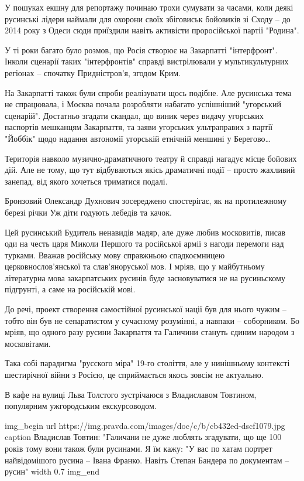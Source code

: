 У пошуках екшну для репортажу починаю трохи сумувати за часами, коли деякі
русинські лідери наймали для охорони своїх збіговиськ бойовиків зі Сходу – до
2014 року з Одеси сюди приїздили навіть активісти проросійської партії
"Родина".

У ті роки багато було розмов, що Росія створює на Закарпатті "інтерфронт".
Інколи сценарії таких "інтерфронтів" справді вистрілювали у мультикультурних
регіонах – спочатку Придністров’я, згодом Крим.

На Закарпатті також були спроби реалізувати щось подібне. Але русинська тема не
спрацювала, і Москва почала розробляти набагато успішніший "угорський
сценарій". Достатньо згадати скандал, що виник через видачу угорських паспортів
мешканцям Закарпаття, та заяви угорських ультраправих з партії "Йоббік" щодо
надання автономії угорській етнічній меншині у Берегово…

Територія навколо музично-драматичного театру й справді нагадує місце бойових
дій. Але не тому, що тут відбуваються якісь драматичні події – просто жахливий
занепад, від якого хочеться триматися подалі.

Бронзовий Олександр Духнович зосереджено спостерігає, як на протилежному березі
річки Уж діти годують лебедів та качок.

Цей русинський Будитель ненавидів мадяр, але дуже любив московитів, писав оди
на честь царя Миколи Першого та російської армії з нагоди перемоги над турками.
Вважав російську мову справжньою спадкоємницею церковнослов’янської та
слав’яноруської мов. І мріяв, що у майбутньому літературна мова закарпатських
русинів буде засновуватися не на русиньскому підгрунті, а саме на російській
мові.

До речі, проект створення самостійної русинської нації був для нього чужим –
тобто він був не сепаратистом у сучасному розумінні, а навпаки – соборником. Бо
мріяв, що одного разу русини Закарпаття та Галичини стануть єдиним народом з
московітами.

Така собі парадигма "русского міра" 19-го століття, але у нинішньому контексті
шестирічної війни з Росією, це сприймається якось зовсім не актуально.

В кафе на вулиці Льва Толстого зустрічаюся з Владиславом Товтином, популярним
ужгородським екскурсоводом.

\ifcmt
img_begin 
    url https://img.pravda.com/images/doc/c/b/cb432ed-dscf1079.jpg
    caption Владислав Товтин: "Галичани не дуже люблять згадувати, що ще 100 років тому вони також були русинами. Я їм кажу: "У вас по хатам портрет найвідомішого русина – Івана Франко. Навіть Степан Бандера по документам – русин"
        width 0.7
img_end
\fi

